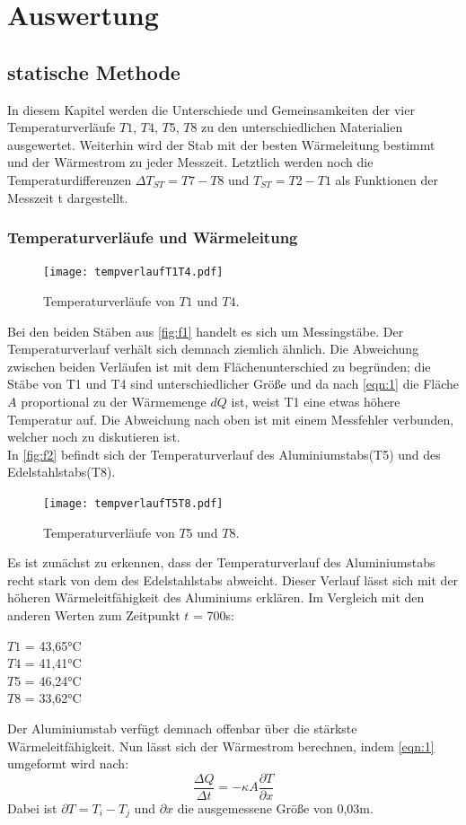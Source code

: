 \section{Auswertung}
\label{sec:Auswertung}

\subsection{statische Methode}
In diesem Kapitel werden die Unterschiede und Gemeinsamkeiten der vier 
Temperaturverläufe $T1$, $T4$, $T5$, $T8$ zu den unterschiedlichen Materialien 
ausgewertet. Weiterhin wird der Stab mit der besten Wärmeleitung bestimmt und 
der Wärmestrom zu jeder Messzeit. Letztlich werden noch die Temperaturdifferenzen 
$\Delta T_{ST}=T7-T8$ und $T_{ST}=T2-T1$ als Funktionen der Messzeit t dargestellt.

\subsubsection{Temperaturverläufe und Wärmeleitung}
\begin{figure}[H]
    \centering
    \texttt{[image: tempverlaufT1T4.pdf]}
    \caption{Temperaturverläufe von $T1$ und $T4$.}
    \label{fig:f1}
\end{figure}
Bei den beiden Stäben aus \autoref{fig:f1} handelt es sich um Messingstäbe. Der 
Temperaturverlauf verhält sich demnach ziemlich ähnlich. Die Abweichung zwischen 
beiden Verläufen ist mit dem Flächenunterschied zu begründen; die Stäbe von 
T1 und T4 sind unterschiedlicher Größe und da nach \autoref{eqn:1} die Fläche
$A$ proportional zu der Wärmemenge $dQ$ ist, weist T1 eine etwas höhere Temperatur 
auf. Die Abweichung nach oben ist mit einem Messfehler verbunden, welcher noch 
zu diskutieren ist.
\\
In \autoref{fig:f2} befindt sich der Temperaturverlauf des Aluminiumstabs(T5)
und des Edelstahlstabs(T8).
\begin{figure}[H]
    \centering
    \texttt{[image: tempverlaufT5T8.pdf]}
    \caption{Temperaturverläufe von $T5$ und $T8$.}
    \label{fig:f2}
\end{figure}
\noindent Es ist zunächst zu erkennen, dass der Temperaturverlauf des
Aluminiumstabs recht stark von dem des Edelstahlstabs abweicht. Dieser Verlauf
lässt sich mit der höheren Wärmeleitfähigkeit des Aluminiums erklären. Im 
Vergleich mit den anderen Werten zum Zeitpunkt $t$ = 700s:
\begin{center}
  $T1$ = 43,65°C\\
  $T4$ = 41,41°C\\
  $T5$ = 46,24°C\\
  $T8$ = 33,62°C
\end{center}
Der Aluminiumstab verfügt demnach offenbar über die stärkste Wärmeleitfähigkeit.
Nun lässt sich der Wärmestrom berechnen, indem \autoref{eqn:1} umgeformt wird nach:
\begin{equation}
  \frac{\Delta Q}{\Delta t} = - \kappa A \frac{\partial T}{\partial x}
\end{equation}
Dabei ist $\partial T = T_i - T_j$ und $\partial x$ die ausgemessene Größe von 
0,03m.

